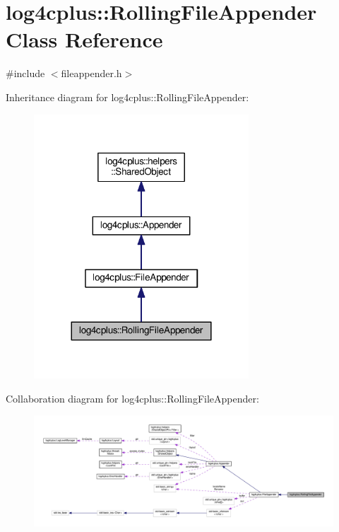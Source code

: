 \hypertarget{classlog4cplus_1_1RollingFileAppender}{\section{log4cplus\-:\-:Rolling\-File\-Appender Class Reference}
\label{classlog4cplus_1_1RollingFileAppender}
}


{\ttfamily \#include $<$fileappender.\-h$>$}



Inheritance diagram for log4cplus\-:\-:Rolling\-File\-Appender\-:
\nopagebreak
\begin{figure}[H]
\begin{center}
\leavevmode
\includegraphics[width=228pt]{classlog4cplus_1_1RollingFileAppender__inherit__graph}
\end{center}
\end{figure}


Collaboration diagram for log4cplus\-:\-:Rolling\-File\-Appender\-:
\nopagebreak
\begin{figure}[H]
\begin{center}
\leavevmode
\includegraphics[width=350pt]{classlog4cplus_1_1RollingFileAppender__coll__graph}
\end{center}
\end{figure}
